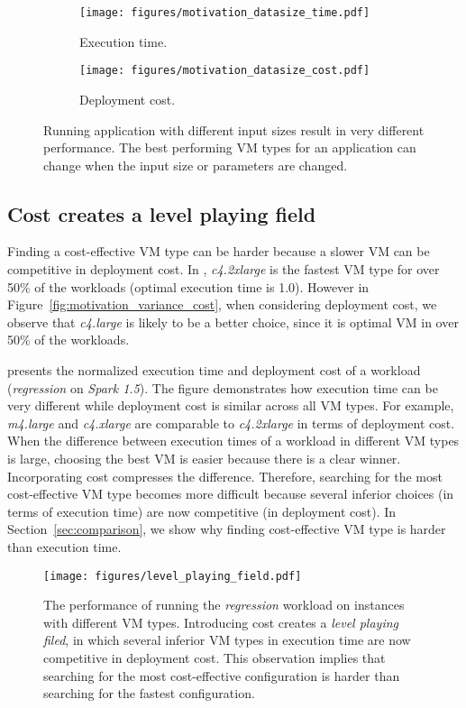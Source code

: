 \begin{figure}
\centering
\begin{subfigure}[b]{0.45\textwidth}
    \texttt{[image: figures/motivation\_datasize\_time.pdf]}
    \caption{Execution time.}
    \label{fig:motivation_datasize_a}
\end{subfigure}
\hfill
\begin{subfigure}[b]{0.45\textwidth}
    \texttt{[image: figures/motivation\_datasize\_cost.pdf]}
    \caption{Deployment cost.}
    \label{fig:motivation_datasize_b}
\end{subfigure}
\caption{Running application with different input sizes result in very different performance.
 The best performing VM types for an application can change when the input size or parameters are changed.}
\label{fig:motivation_datasize}
\end{figure}



\subsection*{Cost creates a level playing field}
Finding a cost-effective VM type can be harder because
a slower VM can be competitive in deployment cost.
In \myfigure{\ref{fig:motivation_variance_time}},  \emph{c4.2xlarge} is the fastest VM type for over 50\% of the workloads (optimal execution time is 1.0).
However in Figure~\ref{fig:motivation_variance_cost}, when considering deployment cost, we observe that
\emph{c4.large} is likely to be a better choice, since it is optimal VM in over 50\% of the workloads.

\myfigure{\ref{fig:level_playing_field}} presents the normalized execution time
and deployment cost of a workload (\emph{regression} on \emph{Spark 1.5}).
The figure demonstrates how execution time can be very different
while deployment cost is similar across all VM types. For example, \emph{m4.large} and \emph{c4.xlarge} are comparable to \emph{c4.2xlarge} in terms of deployment cost.
When the difference between execution times of a workload in different VM types is large, choosing the best VM is easier because there is a clear winner.
Incorporating cost compresses the difference.
Therefore, searching for the most cost-effective VM type becomes more difficult because several inferior choices (in terms of execution time) are now competitive (in deployment cost).
In Section~\ref{sec:comparison}, we show why finding cost-effective VM type
is harder than execution time.


\begin{figure}
    \centering
    \texttt{[image: figures/level\_playing\_field.pdf]}
    \caption{The performance of running the \emph{regression} workload on instances with different VM types.
    Introducing cost creates a \emph{level playing filed}, in which several inferior VM types in execution time are now competitive in deployment cost.
    This observation implies that searching for the most cost-effective configuration is harder than searching for the fastest configuration.}
    \label{fig:level_playing_field}
\end{figure}